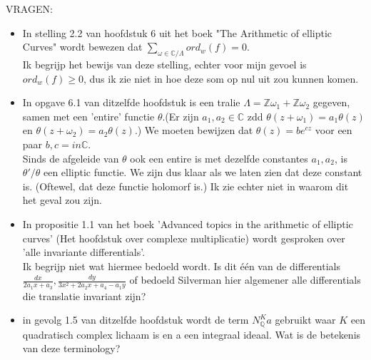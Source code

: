 \documentclass{article}
\begin{document}
VRAGEN:\\
\begin{itemize}
\item In stelling 2.2 van hoofdstuk 6 uit het boek "The Arithmetic of elliptic Curves" wordt bewezen dat $\sum_{\omega \in \mathbb{C}/ \Lambda} ord_w(f)=0$.\\
Ik begrijp het bewijs van deze stelling, echter voor mijn gevoel is $ord_w(f) \geq 0$, dus ik zie niet in hoe deze som op nul uit zou kunnen komen.
\item In opgave 6.1 van ditzelfde hoofdstuk is een tralie $\Lambda=\mathbb{Z}\omega_1+\mathbb{Z}\omega_2$ gegeven, samen met een 'entire' functie $\theta$.(Er zijn $a_1, a_2 \in \mathbb{C}$ zdd $\theta(z+\omega_1)=a_1\theta(z)$ en $\theta(z+\omega_2)=a_2\theta(z)$.) We moeten bewijzen dat $\theta (z) = be^{cz}$ voor een paar $b,c =in \mathbb{C}$. \\
Sinds de afgeleide van $\theta$ ook een entire is met dezelfde constantes $a_1,a_2$, is $\theta'/\theta$ een elliptic functie. We zijn dus klaar als we laten zien dat deze constant is. (Oftewel, dat deze functie holomorf is.) Ik zie echter niet in waarom dit het geval zou zijn.
\item In propositie 1.1 van het boek 'Advanced topics in the arithmetic of elliptic curves' (Het hoofdstuk over complexe multiplicatie) wordt gesproken over 'alle invariante differentials'.\\
Ik begrijp niet wat hiermee bedoeld wordt. Is dit \'e\'en van de differentials $\frac{dx}{2a_1x+a_3},\frac{dy}{3x^2 +2a_2x+a_4-a_1y}$ of bedoeld Silverman hier algemener alle differentials die translatie invariant zijn?
\item in gevolg 1.5 van ditzelfde hoofdstuk wordt de term $N_{\mathbb{Q}}^Ka$ gebruikt waar $K$ een quadratisch complex lichaam is en a een integraal ideaal. Wat is de betekenis van deze terminology? 
\end{itemize}
\end{document}
